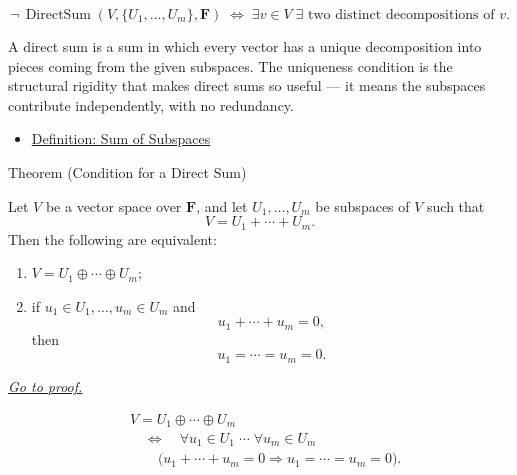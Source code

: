 \begin{remark*}
\[
\neg\,\operatorname{DirectSum}(V,\{U_1,\dots,U_m\},\mathbf{F})
\;\Longleftrightarrow\;
\exists v \in V\;\exists \text{ two distinct decompositions of } v.
\]
\end{remark*}

\begin{remark*}[Interpretation]
A direct sum is a sum in which every vector has a unique decomposition
into pieces coming from the given subspaces. The uniqueness condition is
the structural rigidity that makes direct sums so useful --- it means the
subspaces contribute independently, with no redundancy.
\end{remark*}

\begin{dependencies}
\begin{itemize}
  \item \hyperref[def:sum-of-subspaces]{Definition: Sum of Subspaces}
\end{itemize}
\end{dependencies}






\begin{theorembox}{Theorem (Condition for a Direct Sum)}
\begin{theorem}
\label{thm:condition-for-direct-sum}
Let $V$ be a vector space over $\mathbf{F}$, and let
$U_1,\dots,U_m$ be subspaces of $V$ such that
\[
V=U_1+\cdots+U_m.
\]
Then the following are equivalent:
\begin{enumerate}[label=(\roman*)]
  \item \(V=U_1\oplus\cdots\oplus U_m\);
  \item if \(u_1 \in U_1,\dots,u_m \in U_m\) and
        \[
        u_1+\cdots+u_m=0,
        \]
        then
        \[
        u_1=\cdots=u_m=0.
        \]
\end{enumerate}
\hyperref[prf:condition-for-direct-sum]{\textit{Go to proof.}}
\end{theorem}
\end{theorembox}

\begin{remark*}
\[
\begin{aligned}
&V=U_1\oplus\cdots\oplus U_m \\
&\quad\Longleftrightarrow\quad
\forall u_1 \in U_1 \;\cdots\; \forall u_m \in U_m \\
&\qquad
\bigl(u_1+\cdots+u_m=0 \Rightarrow u_1=\cdots=u_m=0\bigr).
\end{aligned}
\]
\end{remark*}

